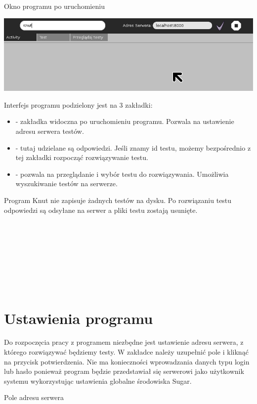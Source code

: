 \documentclass[letterpaper,10pt,polish]{sphinxmanual}
\begin{document}
Okno programu po uruchomieniu

\includegraphics{OknoStart.png}

Interfejs programu podzielony jest na 3 zakładki:
\begin{itemize}
\item {} 
 - zakładka widoczna po uruchomieniu programu. Pozwala na ustawienie adresu serwera testów.

\item {} 
 - tutaj udzielane są odpowiedzi. Jeśli znamy id testu, możemy bezpośrednio z tej zakładki rozpocząć rozwiązywanie testu.

\item {} 
 - pozwala na przeglądanie i wybór testu do rozwiązywania. Umożliwia wyszukiwanie testów na serwerze.

\end{itemize}

Program Knut nie zapisuje żadnych testów na dysku. Po rozwiązaniu testu odpowiedzi są odsyłane na serwer a pliki testu zostają usunięte.
{\raggedright{}~\\
~\\
~\\
~\\
~\\
~\\
~}


\section{Ustawienia programu}
\label{index:ustawienia-programu}
Do rozpoczęcia pracy z programem niezbędne jest ustawienie adresu serwera, z którego rozwiązywać będziemy testy. W zakładce  należy uzupełnić pole  i kliknąć na przycisk potwierdzenia. Nie ma konieczności wprowadzania danych typu login lub hasło ponieważ program będzie przedstawiał się serwerowi jako użytkownik systemu wykorzystując ustawienia globalne środowiska Sugar.

Pole adresu serwera

\end{document}
